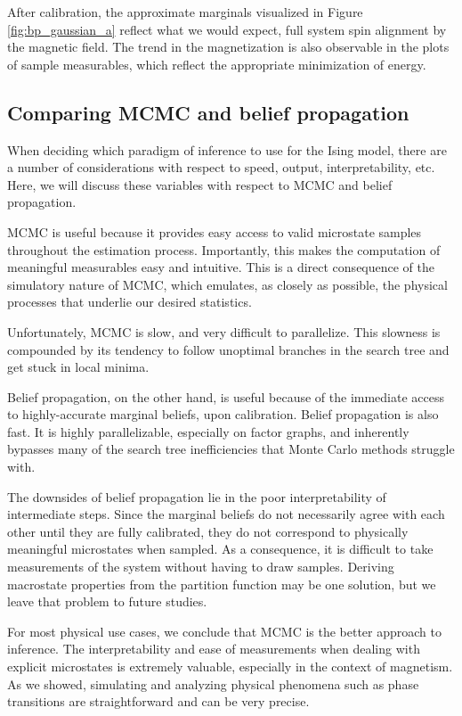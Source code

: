 \documentclass{article}
\begin{document}
After calibration, the approximate marginals visualized in Figure
\ref{fig:bp_gaussian_a} reflect what we would expect, full system spin alignment 
by the magnetic field. 
The trend in the magnetization is also observable in the plots of sample 
measurables, which reflect the appropriate minimization of energy. 

\subsection{Comparing MCMC and belief propagation}

When deciding which paradigm of inference to use for the Ising model, there are 
a number of considerations with respect to speed, output, interpretability, etc. 
Here, we will discuss these variables with respect to MCMC and belief 
propagation. 

MCMC is useful because it provides easy access to valid microstate samples 
throughout the estimation process. 
Importantly, this makes the computation of meaningful measurables easy and 
intuitive. 
This is a direct consequence of the simulatory nature of MCMC, which emulates, 
as closely as possible, the physical processes that underlie our desired 
statistics. 

Unfortunately, MCMC is slow, and very difficult to parallelize. 
This slowness is compounded by its tendency to follow unoptimal branches in the 
search tree and get stuck in local minima. 

Belief propagation, on the other hand, is useful because of the immediate access 
to highly-accurate marginal beliefs, upon calibration. 
Belief propagation is also fast. 
It is highly parallelizable, especially on factor graphs, and inherently 
bypasses many of the search tree inefficiencies that Monte Carlo methods 
struggle with. 

The downsides of belief propagation lie in the poor interpretability of 
intermediate steps. 
Since the marginal beliefs do not necessarily agree with each other until 
they are fully calibrated, they do not correspond to physically meaningful 
microstates when sampled. 
As a consequence, it is difficult to take measurements of the system without 
having to draw samples. 
Deriving macrostate properties from the partition function may be one solution, 
but we leave that problem to future studies. 

For most physical use cases, we conclude that MCMC is the better approach to 
inference. 
The interpretability and ease of measurements when dealing with explicit 
microstates is extremely valuable, especially in the context of magnetism. 
As we showed, simulating and analyzing physical phenomena such as phase 
transitions are straightforward and can be very precise. 
%
%
%
%
%
\end{document}
